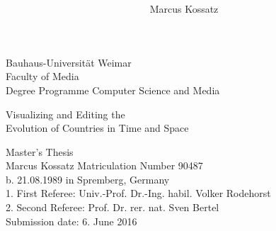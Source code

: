 \documentclass[10pt, a4paper]{report}
\title{\titleFirst \\ \titleSecond}
\author{Marcus Kossatz}
\date{\submissionDate}
\newcommand{\titleFirst}  {Visualizing and Editing the}
\newcommand{\titleSecond} {Evolution of Countries in Time and Space}
\newcommand{\submissionDate}{6. June 2016}
\begin{document}

\begin{titlepage}

Bauhaus-Universität Weimar \\
Faculty of Media \\
Degree Programme Computer Science and Media \\ [2.0cm]

\begin{center}

{\huge \titleFirst} \\[0.5cm]
{\huge \titleSecond} \\[3.5cm]
\end{center}

{\LARGE Master's Thesis} \\[1.0cm]

Marcus Kossatz \hfill Matriculation Number 90487 \\
b. 21.08.1989 in Spremberg, Germany \\

1. First Referee: Univ.-Prof. Dr.-Ing. habil. Volker Rodehorst \\
2. Second Referee: Prof. Dr. rer. nat. Sven Bertel \\

\vfill
Submission date: \submissionDate

\end{titlepage}



\tableofcontents

\listoffigures
\listoftables

















{\footnotesize{
  {}
}}





\end{document}
